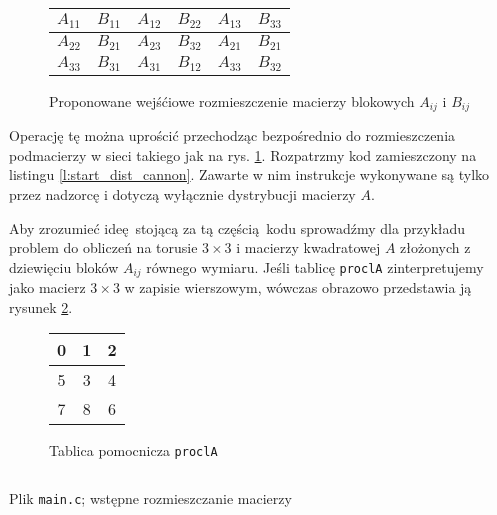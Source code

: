 \begin{figure}[H]
\centering
\begin{tabular}{|cc|cc|cc|}
\hline
\(A_{11}\) & \(B_{11}\) & \(A_{12}\) & \(B_{22}\) & \(A_{13}\) & \(B_{33}\) \\
\hline
\(A_{22}\) & \(B_{21}\) & \(A_{23}\) & \(B_{32}\) & \(A_{21}\) & \(B_{21}\) \\
\hline
\(A_{33}\) & \(B_{31}\) & \(A_{31}\) & \(B_{12}\) & \(A_{33}\) & \(B_{32}\) \\
\hline
\end{tabular}
\caption{Proponowane wejśćiowe rozmieszczenie macierzy blokowych \(A_{ij}\) i \(B_{ij}\)} 
\label{fig:cannon_src2}
\end{figure}

Operację tę można uprościć przechodząc bezpośrednio do rozmieszczenia podmacierzy w sieci takiego jak na rys. \ref{fig:cannon_src2}. Rozpatrzmy kod zamieszczony na listingu \ref{l:start_dist_cannon}. Zawarte w nim instrukcje wykonywane są tylko przez nadzorcę i dotyczą wyłącznie dystrybucji macierzy \(A\).

Aby zrozumieć ideę stojącą za tą częścią kodu sprowadźmy dla przykładu problem do obliczeń na torusie \(3\times 3\) i macierzy kwadratowej \(A\) złożonych z dziewięciu bloków \(A_{ij}\) równego wymiaru. Jeśli tablicę \texttt{proclA} zinterpretujemy jako macierz \(3\times 3\) w zapisie wierszowym, wówczas obrazowo przedstawia ją rysunek \ref{fig:proclA}.

\begin{figure}[H]
\centering
\begin{tabular}{|c|c|c|}
\hline
0 & 1 & 2 \\
\hline
5 & 3 & 4 \\
\hline
7 & 8 & 6 \\
\hline
\end{tabular}
\caption{Tablica pomocnicza \texttt{proclA}}
\label{fig:proclA}
\end{figure}

\begin{listing}[H]
\inputminted[fontsize=\footnotesize,bgcolor=bg,linenos,firstnumber=443,firstline=443,lastline=485]{c}{includes/listings/main.c}
\caption{Plik \texttt{main.c}; wstępne rozmieszczanie macierzy}
\label{l:start_dist_cannon}
\end{listing}

